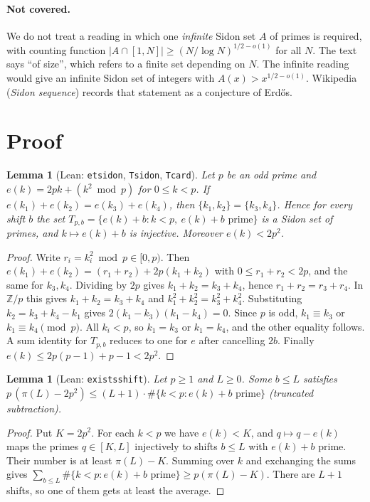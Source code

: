 \documentclass[11pt]{article}
\newtheorem{lemma}[theorem]{Lemma}
\theoremstyle{definition}
\theoremstyle{remark}
\renewcommand{\_}{\oldus\allowbreak}
\begin{document}
\paragraph{Not covered.} We do not treat a reading in which one \emph{infinite} Sidon set $A$ of primes is
required, with counting function $|A\cap[1,N]|\ge (N/\log N)^{1/2-o(1)}$ for all $N$. The text says ``of
size'', which refers to a finite set depending on $N$. The infinite reading would give an infinite Sidon set
of integers with $A(x)>x^{1/2-o(1)}$. Wikipedia (\emph{Sidon sequence}) records that statement as a
conjecture of Erd\H{o}s.

\section{Proof}

\begin{lemma}[Lean: \texttt{et\_sidon}, \texttt{T\_sidon}, \texttt{T\_card}]\label{lem:et}
Let $p$ be an odd prime and $e(k)=2pk+(k^2 \bmod p)$ for $0\le k<p$. If $e(k_1)+e(k_2)=e(k_3)+e(k_4)$, then
$\{k_1,k_2\}=\{k_3,k_4\}$. Hence for every shift $b$ the set
$T_{p,b}=\{e(k)+b : k<p,\ e(k)+b \text{ prime}\}$ is a Sidon set of primes, and $k\mapsto e(k)+b$ is
injective. Moreover $e(k)<2p^2$.
\end{lemma}
\begin{proof}
Write $r_i=k_i^2\bmod p\in[0,p)$. Then $e(k_1)+e(k_2)=(r_1+r_2)+2p(k_1+k_2)$ with $0\le r_1+r_2<2p$, and the same
for $k_3,k_4$. Dividing by $2p$ gives $k_1+k_2=k_3+k_4$, hence $r_1+r_2=r_3+r_4$. In $\mathbb{Z}/p$ this gives
$k_1+k_2=k_3+k_4$ and $k_1^2+k_2^2=k_3^2+k_4^2$. Substituting $k_2=k_3+k_4-k_1$ gives $2(k_1-k_3)(k_1-k_4)=0$.
Since $p$ is odd, $k_1\equiv k_3$ or $k_1\equiv k_4 \pmod p$. All $k_i<p$, so $k_1=k_3$ or $k_1=k_4$, and the
other equality follows. A sum identity for $T_{p,b}$ reduces to one for $e$ after cancelling $2b$. Finally
$e(k)\le 2p(p-1)+p-1<2p^2$.
\end{proof}

\begin{lemma}[Lean: \texttt{exists\_shift}]\label{lem:avg}
Let $p\ge1$ and $L\ge0$. Some $b\le L$ satisfies
$p\,(\pi(L)-2p^2)\le (L+1)\cdot\#\{k<p : e(k)+b\text{ prime}\}$ (truncated subtraction).
\end{lemma}
\begin{proof}
Put $K=2p^2$. For each $k<p$ we have $e(k)<K$, and $q\mapsto q-e(k)$ maps the primes $q\in[K,L]$
injectively to shifts $b\le L$ with $e(k)+b$ prime. Their number is at least $\pi(L)-K$. Summing over $k$ and
exchanging the sums gives $\sum_{b\le L}\#\{k<p : e(k)+b \text{ prime}\}\ge p(\pi(L)-K)$. There are $L+1$
shifts, so one of them gets at least the average.
\end{proof}
\end{document}
